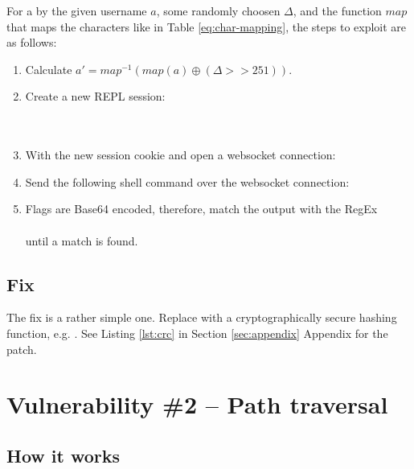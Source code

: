 \documentclass[10pt]{article}
\begin{document}
	For a by the  given username $a$, some randomly choosen $\Delta$, and the function $map$ that maps the characters like in Table \ref{eq:char-mapping}, the steps to exploit are as follows:
\begin{enumerate}
	\item Calculate $a' = map^{-1}(map(a) \oplus (\Delta >> 251))$.
	\item Create a new REPL session: \\
	       \\
	       \\
	\item With the new session cookie and  open a websocket connection: \\
	\item Send the following shell command over the websocket connection: \\
	\item Flags are Base64 encoded, therefore, match the output with the RegEx \\
	       \\
	      until a match is found.
\end{enumerate}

\subsection{Fix}

The fix is a rather simple one. Replace  with a cryptographically secure hashing function, e.g. . See Listing \ref{lst:crc} in Section \ref{sec:appendix} Appendix for the patch.

\section{Vulnerability \#2 -- Path traversal}

\subsection{How it works}
\end{document}
